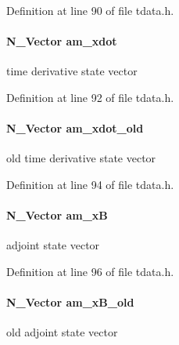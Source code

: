 Definition at line 90 of file tdata.\+h.

\hypertarget{struct_temp_data_abad4a9e3cc9cd42b3fe4e2fe28a915c1}{}
\paragraph[{am\+\_\+xdot}]{\setlength{\rightskip}{0pt plus 5cm}N\+\_\+\+Vector am\+\_\+xdot}\label{struct_temp_data_abad4a9e3cc9cd42b3fe4e2fe28a915c1}
time derivative state vector 

Definition at line 92 of file tdata.\+h.

\hypertarget{struct_temp_data_a6a8af565a7f6ec58c4fbcd044c049d80}{}
\paragraph[{am\+\_\+xdot\+\_\+old}]{\setlength{\rightskip}{0pt plus 5cm}N\+\_\+\+Vector am\+\_\+xdot\+\_\+old}\label{struct_temp_data_a6a8af565a7f6ec58c4fbcd044c049d80}
old time derivative state vector 

Definition at line 94 of file tdata.\+h.

\hypertarget{struct_temp_data_a318f0b9b1f4b33326184a350912c6fb1}{}
\paragraph[{am\+\_\+x\+B}]{\setlength{\rightskip}{0pt plus 5cm}N\+\_\+\+Vector am\+\_\+x\+B}\label{struct_temp_data_a318f0b9b1f4b33326184a350912c6fb1}
adjoint state vector 

Definition at line 96 of file tdata.\+h.

\hypertarget{struct_temp_data_a33e09af3351a4d4889e62d0d0d964ce5}{}
\paragraph[{am\+\_\+x\+B\+\_\+old}]{\setlength{\rightskip}{0pt plus 5cm}N\+\_\+\+Vector am\+\_\+x\+B\+\_\+old}\label{struct_temp_data_a33e09af3351a4d4889e62d0d0d964ce5}
old adjoint state vector 

